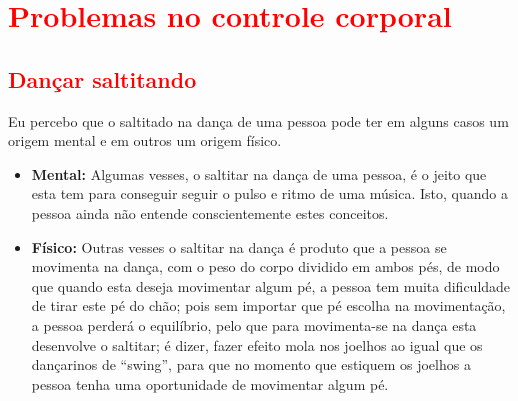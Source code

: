 \section{\textcolor{red}{ Problemas no controle corporal}}

\subsection{\textcolor{red}{Dançar saltitando}}

\begin{problemT}
Eu percebo que o saltitado na dança de uma pessoa pode ter em alguns casos um origem mental e em outros um origem físico.
\begin{itemize}
\item \textbf{Mental:} Algumas vesses, o saltitar na dança de uma pessoa, 
é o jeito que esta tem para conseguir  seguir o pulso e ritmo de uma música. 
Isto, quando a pessoa ainda não entende conscientemente estes conceitos.
\item \textbf{Físico:} Outras vesses o saltitar na dança é produto que a pessoa se movimenta na dança,
com o peso do corpo dividido em ambos pés, de modo que quando esta deseja movimentar algum pé,
a pessoa tem muita dificuldade de tirar este pé do chão; 
pois sem importar que pé escolha na movimentação, a pessoa perderá o equilíbrio,
pelo que para movimenta-se na dança esta desenvolve o saltitar; é dizer, 
fazer efeito mola nos joelhos ao igual que os dançarinos de ``swing'', 
para que no momento que estiquem os joelhos a pessoa tenha uma oportunidade de movimentar algum pé.    
\end{itemize}
\end{problemT}



